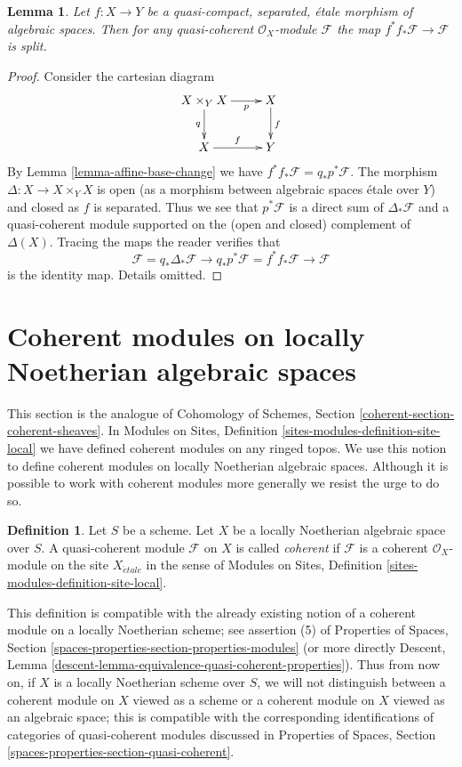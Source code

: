 \documentclass{stacks-project}
\theoremstyle{plain}
\newtheorem{lemma}[subsection]{Lemma}
\theoremstyle{definition}
\newtheorem{definition}[subsection]{Definition}
\theoremstyle{remark}
\numberwithin{equation}{subsection}
\def\etale{{\acute{e}tale}}
\begin{document}
\begin{lemma}
\label{lemma-etale-pull-push-split}
Let $f : X \to Y$ be a quasi-compact, separated, \'etale morphism
of algebraic spaces. Then for any quasi-coherent $\mathcal{O}_X$-module
$\mathcal{F}$ the map $f^*f_*\mathcal{F} \to \mathcal{F}$ is split.
\end{lemma}

\begin{proof}
Consider the cartesian diagram
$$
\xymatrix{
X \times_Y X \ar[r]_-p \ar[d]_q & X \ar[d]^f \\
X \ar[r]^f & Y
}
$$
By Lemma \ref{lemma-affine-base-change} we have
$f^*f_*\mathcal{F} = q_*p^*\mathcal{F}$. The morphism
$\Delta : X \to X \times_Y X$ is open (as a morphism between
algebraic spaces \'etale over $Y$) and closed as $f$ is separated.
Thus we see that $p^*\mathcal{F}$ is a direct sum of
$\Delta_*\mathcal{F}$ and a quasi-coherent module supported
on the (open and closed) complement of $\Delta(X)$.
Tracing the maps the reader verifies that
$$
\mathcal{F} = q_*\Delta_*\mathcal{F} \to
q_*p^*\mathcal{F} = f^*f_*\mathcal{F} \to
\mathcal{F}
$$
is the identity map. Details omitted.
\end{proof}



\section{Coherent modules on locally Noetherian algebraic spaces}
\label{section-coherent}

\noindent
This section is the analogue of
Cohomology of Schemes, Section \ref{coherent-section-coherent-sheaves}.
In Modules on Sites, Definition \ref{sites-modules-definition-site-local}
we have defined coherent modules on any ringed topos. We use this notion
to define coherent modules on locally Noetherian algebraic spaces.
Although it is possible to work with coherent modules more generally
we resist the urge to do so.

\begin{definition}
\label{definition-coherent}
Let $S$ be a scheme. Let $X$ be a locally Noetherian algebraic space over $S$.
A quasi-coherent module $\mathcal{F}$ on $X$ is called {\it coherent}
if $\mathcal{F}$ is a coherent $\mathcal{O}_X$-module on the site
$X_\etale$ in the sense of
Modules on Sites, Definition \ref{sites-modules-definition-site-local}.
\end{definition}

\noindent
This definition is compatible with the already existing notion of a
coherent module on a locally Noetherian scheme; see assertion (5) of
Properties of Spaces, Section
\ref{spaces-properties-section-properties-modules} (or more directly
Descent, Lemma \ref{descent-lemma-equivalence-quasi-coherent-properties}).
Thus from now on, if $X$ is a locally Noetherian scheme over $S$,
we will not distinguish between a coherent module on $X$ viewed
as a scheme or a coherent module on $X$ viewed as an algebraic space;
this is compatible with the corresponding identifications of categories
of quasi-coherent modules discussed in
Properties of Spaces, Section \ref{spaces-properties-section-quasi-coherent}.
\end{document}
